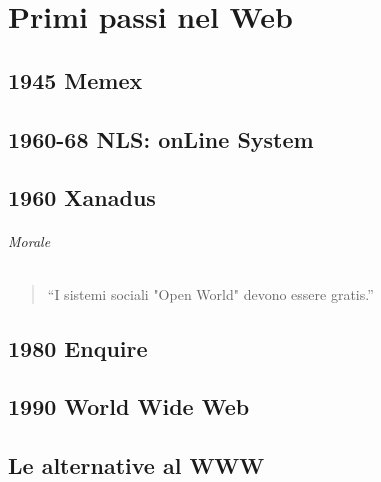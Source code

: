 

\chapter{Primi passi nel Web}
	
	\section{1945 Memex}
		
	\section{1960-68 NLS: onLine System}
		
	\section{1960 Xanadus}
		
	\subparagraph*{Morale}
			\begin{quote}
				``I sistemi sociali "Open World" devono essere gratis.''
			\end{quote}
		
	\section{1980 Enquire}
		
	\section{1990 World Wide Web}
		
	\section{Le alternative al WWW}
